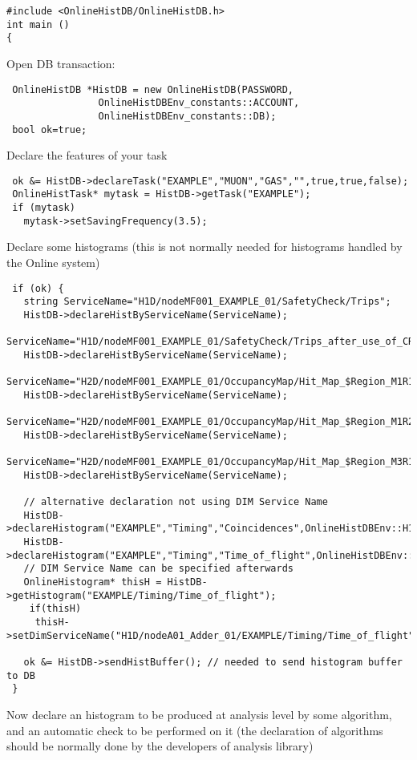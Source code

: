 \documentclass{lhcbnote}
\begin{document}
\begin{verbatim}
#include <OnlineHistDB/OnlineHistDB.h>
int main ()
{
\end{verbatim}
Open DB transaction:
\begin{verbatim}
 OnlineHistDB *HistDB = new OnlineHistDB(PASSWORD,
				OnlineHistDBEnv_constants::ACCOUNT,
			 	OnlineHistDBEnv_constants::DB);
 bool ok=true;
\end{verbatim}
Declare the features of your task 
\begin{verbatim}
 ok &= HistDB->declareTask("EXAMPLE","MUON","GAS","",true,true,false);
 OnlineHistTask* mytask = HistDB->getTask("EXAMPLE");
 if (mytask)
   mytask->setSavingFrequency(3.5);
\end{verbatim}
Declare some histograms (this is not normally needed for histograms
handled by the Online system)
\begin{verbatim}
 if (ok) {
   string ServiceName="H1D/nodeMF001_EXAMPLE_01/SafetyCheck/Trips";
   HistDB->declareHistByServiceName(ServiceName);
   ServiceName="H1D/nodeMF001_EXAMPLE_01/SafetyCheck/Trips_after_use_of_CRack";
   HistDB->declareHistByServiceName(ServiceName);
   ServiceName="H2D/nodeMF001_EXAMPLE_01/OccupancyMap/Hit_Map_$Region_M1R1";
   HistDB->declareHistByServiceName(ServiceName); 
   ServiceName="H2D/nodeMF001_EXAMPLE_01/OccupancyMap/Hit_Map_$Region_M1R2";
   HistDB->declareHistByServiceName(ServiceName);
   ServiceName="H2D/nodeMF001_EXAMPLE_01/OccupancyMap/Hit_Map_$Region_M3R1";
   HistDB->declareHistByServiceName(ServiceName);
   
   // alternative declaration not using DIM Service Name
   HistDB->declareHistogram("EXAMPLE","Timing","Coincidences",OnlineHistDBEnv::H1D);
   HistDB->declareHistogram("EXAMPLE","Timing","Time_of_flight",OnlineHistDBEnv::H1D);
   // DIM Service Name can be specified afterwards
   OnlineHistogram* thisH = HistDB->getHistogram("EXAMPLE/Timing/Time_of_flight");
    if(thisH)
     thisH->setDimServiceName("H1D/nodeA01_Adder_01/EXAMPLE/Timing/Time_of_flight");
    
   ok &= HistDB->sendHistBuffer(); // needed to send histogram buffer to DB
 }
\end{verbatim}
Now declare an histogram to be produced at analysis level by some
algorithm, and an automatic check to be performed on it (the
declaration of algorithms should be normally done by the developers of analysis
library)  
\end{document}
